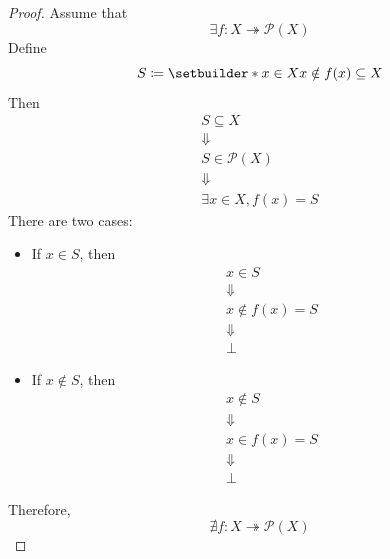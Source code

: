 \begin{proof}
    Assume that
    \[
    \exists f: X \twoheadrightarrow \mathcal{P}(X)
    \]
    Define
    \[
    S \coloneqq \setbuilder*{x \in X}{x \notin f(x)} \subseteq X
    \]
    Then
    \[
    \begin{array}{c}
        S \subseteq X \\
        \Downarrow \\
        S \in \mathcal{P}(X) \\
        \Downarrow \\
        \exists x \in X, f(x) = S
    \end{array}
    \]
    There are two cases:
    \begin{itemize}
        \item If $x \in S$, then
        \[
        \begin{array}{c}
            x \in S \\
            \Downarrow \\
            x \notin f(x) = S \\
            \Downarrow \\
            \bot
        \end{array}
        \]
        \item If $x \notin S$, then
        \[
        \begin{array}{c}
            x \notin S \\
            \Downarrow \\
            x \in f(x) = S \\
            \Downarrow \\
            \bot
        \end{array}
        \]
    \end{itemize}
    Therefore,
    \[
    \nexists f: X \twoheadrightarrow \mathcal{P}(X)
    \]
\end{proof}
